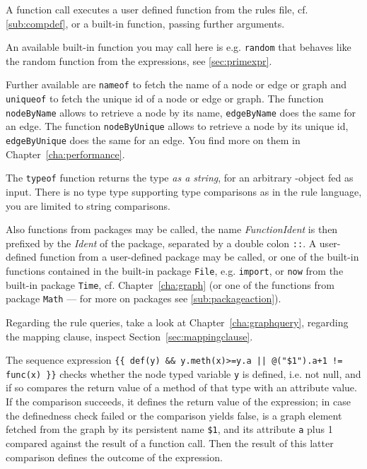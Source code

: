 A function call executes a user defined function from the rules file, cf. \ref{sub:compdef},
or a built-in function, passing further arguments.

An available built-in function you may call here is e.g. \texttt{random} that behaves like the random function from the expressions, see \ref{sec:primexpr}.

Further available are \texttt{nameof} to fetch the name of a node or edge or graph and \texttt{uniqueof} to fetch the unique id of a node or edge or graph.
The function \texttt{nodeByName} allows to retrieve a node by its name, \texttt{edgeByName} does the same for an edge.
The function \texttt{nodeByUnique} allows to retrieve a node by its unique id, \texttt{edgeByUnique} does the same for an edge.
You find more on them in Chapter~\ref{cha:performance}.

The \texttt{typeof} function returns the type \emph{as a string}, for an arbitrary \GrG-object fed as input.
There is no type type supporting type comparisons as in the rule language, you are limited to string comparisons.

Also functions from packages may be called, the name \emph{FunctionIdent} is then prefixed by the \emph{Ident} of the package, separated by a double colon \texttt{::}.
A user-defined function from a user-defined package may be called, or one of the built-in functions contained in the built-in package \texttt{File}, e.g. \texttt{import}, or \texttt{now} from the built-in package \texttt{Time}, cf. Chapter~\ref{cha:graph} (or one of the functions from package \texttt{Math} --- for more on packages see \ref{sub:packageaction}).

Regarding the rule queries, take a look at Chapter~\ref{cha:graphquery}, regarding the mapping clause, inspect Section~\ref{sec:mappingclause}.

\begin{example}
The sequence expression \verb#{{ def(y) && y.meth(x)>=y.a || @("$1").a+1 != func(x) }}# checks whether the node typed variable \texttt{y} is defined, i.e. not null, and if so compares the return value of a method of that type with an attribute value. If the comparison succeeds, it defines the return value of the expression; in case the definedness check failed or the comparison yields false, is a graph element fetched from the graph by its persistent name \verb#$1#, and its attribute \texttt{a} plus 1 compared against the result of a function call. Then the result of this latter comparison defines the outcome of the expression.
\end{example}


